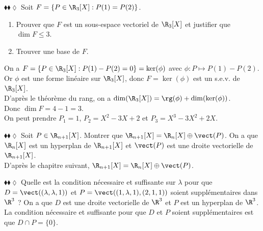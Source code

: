 \documentclass[11pt]{article}
\begin{document}
\begin{exercice}{$\blacklozenge\blacklozenge\lozenge$}{}
    Soit $F = \{P \in \R_3[X] : P(1) = P(2)\}$.
    \begin{enumerate}
        \item Prouver que $F$ est un sous-espace vectoriel de $\R_3[X]$ et justifier que $\dim F \leq 3$.
        \item Trouver une base de $F$.
    \end{enumerate}
    \tcblower
     On a $F = \{P \in \R_3[X] : P(1) - P(2) = 0\} = \ker(\phi)$ avec $\phi : P \mapsto P(1) - P(2)$.\\
    Or $\phi$ est une forme linéaire sur $\R_3[X]$, donc $F = \ker(\phi)$ est un s.e.v. de $\R_3[X]$.\\
    D'après le théorème du rang, on a $\dim(\R_3[X]) = \rg(\phi) + \dim(\ker(\phi))$.\\
    Donc $\dim F = 4 - 1 = 3$.\\[0.2cm]
     On peut prendre $P_1 = 1$, $P_2 = X^2 - 3X + 2$ et $P_3 = X^3 - 3X^2 + 2X$.
\end{exercice}

\begin{exercice}{$\blacklozenge\blacklozenge\lozenge$}{}
    Soit $P \in \R_{n+1}[X]$. Montrer que $\R_{n+1}[X] = \R_n[X] \oplus \vect(P)$.
    \tcblower
    On a que $\R_n[X]$ est un hyperplan de $\R_{n+1}[X]$ et $\vect(P)$ est une droite vectorielle de $\R_{n+1}[X]$.\\
    D'après le chapitre suivant, $\R_{n+1}[X] = \R_n[X] \oplus \vect(P)$.
\end{exercice}

\begin{exercice}{$\blacklozenge\blacklozenge\lozenge$}{}
    Quelle est la condition nécessaire et suffisante sur $\lambda$ pour que $D = \vect((\lambda, \lambda, 1))$ et $P = \vect((1, \lambda, 1), (2, 1, 1))$ soient supplémentaires dans $\R^3$ ?
    \tcblower
    On a que $D$ est une droite vectorielle de $\R^3$ et $P$ est un hyperplan de $\R^3$.\\
    La condition nécessaire et suffisante pour que $D$ et $P$ soient supplémentaires est que $D \cap P = \{0\}$.
\end{exercice}
\end{document}
